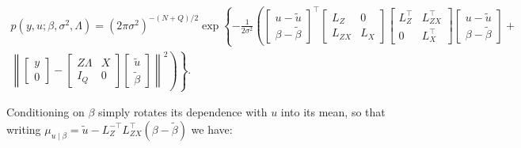 \documentclass[article,shortnames]{jss}
\begin{document}
\begin{multline*}
  p(y, u; \beta, \sigma^2, \Lambda) = (2\pi \sigma^2)^{-(N+Q)/2}
  \exp\left\{-\frac{1}{2\sigma^2} \left( \begin{bmatrix} u - \tilde{u} \\
        \beta - \tilde{\beta}\end{bmatrix}^\top
      \begin{bmatrix} L_Z & 0 \\ L_{ZX} & L_X \end{bmatrix}
      \begin{bmatrix} L_Z^\top & L_{ZX}^\top \\ 0 & L_X^\top \end{bmatrix}
      \begin{bmatrix} u - \tilde{u} \\ \beta - \tilde{\beta} \end{bmatrix} + \right.\right. \\
      \left.\left.\left\|\begin{bmatrix} y \\ 0 \end{bmatrix} - \begin{bmatrix} Z
          \Lambda & X \\ I_Q & 0 \end{bmatrix} \begin{bmatrix} \tilde{u} \\
          \tilde{\beta}\end{bmatrix}\right\|^2\right) \right\}.
\end{multline*}

Conditioning on $\beta$ simply rotates its dependence with $u$ into
its mean, so that writing $\mu_{u\mid\beta} = \tilde{u} -
L_Z^{-\top}L_{ZX}^\top(\beta - \tilde{\beta})$ we have:
\end{document}
